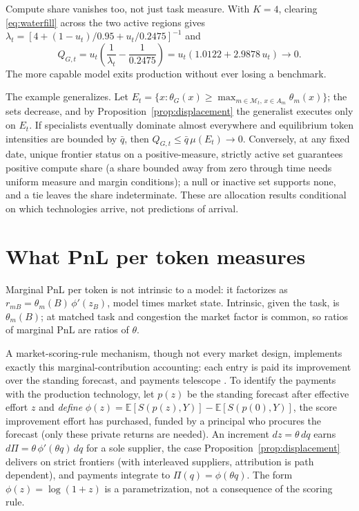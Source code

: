 \documentclass[preprint,11pt,authoryear]{elsarticle}
\begin{document}
Compute share vanishes too, not just task measure. With $K = 4$, clearing \eqref{eq:waterfill} across the two active regions gives $\lambda_t = \left[4 + (1-u_t)/0.95 + u_t/0.2475\right]^{-1}$ and
\begin{equation}
Q_{G,t} = u_t \left( \frac{1}{\lambda_t} - \frac{1}{0.2475} \right)
= u_t \left( 1.0122 + 2.9878\, u_t \right) \longrightarrow 0.
\end{equation}
The more capable model exits production without ever losing a benchmark.

The example generalizes. Let $E_t = \{ x : \theta_G(x) \ge \max_{m \in \mathcal{M}_t,\, x \in A_m} \theta_m(x) \}$; the sets decrease, and by Proposition~\ref{prop:displacement} the generalist executes only on $E_t$. If specialists eventually dominate almost everywhere and equilibrium token intensities are bounded by $\bar q$, then $Q_{G,t} \le \bar q\, \mu(E_t) \to 0$. Conversely, at any fixed date, unique frontier status on a positive-measure, strictly active set guarantees positive compute share (a share bounded away from zero through time needs uniform measure and margin conditions); a null or inactive set supports none, and a tie leaves the share indeterminate. These are allocation results conditional on which technologies arrive, not predictions of arrival.

\section{What PnL per token measures}
\label{sec:measure}

Marginal PnL per token is not intrinsic to a model: it factorizes as $r_{mB} = \theta_m(B)\,\phi'(z_B)$, model times market state. Intrinsic, given the task, is $\theta_m(B)$; at matched task and congestion the market factor is common, so ratios of marginal PnL are ratios of $\theta$.

A market-scoring-rule mechanism, though not every market design, implements exactly this marginal-contribution accounting: each entry is paid its improvement over the standing forecast, and payments telescope \citep{hanson2007}. To identify the payments with the production technology, let $p(z)$ be the standing forecast after effective effort $z$ and \emph{define} $\phi(z) = \mathbb{E}[S(p(z), Y)] - \mathbb{E}[S(p(0), Y)]$, the score improvement effort has purchased, funded by a principal who procures the forecast (only these private returns are needed). An increment $dz = \theta\, dq$ earns $d\Pi = \theta\,\phi'(\theta q)\, dq$ for a sole supplier, the case Proposition~\ref{prop:displacement} delivers on strict frontiers (with interleaved suppliers, attribution is path dependent), and payments integrate to $\Pi(q) = \phi(\theta q)$. The form $\phi(z) = \log(1+z)$ is a parametrization, not a consequence of the scoring rule.
\end{document}
